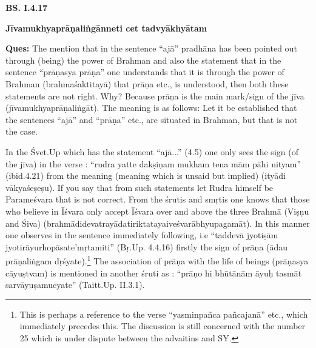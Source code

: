 
\textbf{BS. I.4.17}

\textbf{Jīvamukhyaprāṇaliṅgānneti cet tadvyākhyātam}

\textbf{Ques:} The mention that in the sentence “ajā” pradhāna has been pointed out through (being) the power of Brahman and also the statement that in the sentence “prāṇasya prāṇa” one understands that it is through the power of Brahman (brahmaśaktitayā) that prāṇa etc., is understood, then both these statements are not right. Why?  Because prāṇa is the main mark/sign of the jīva (jīvamukhyaprāṇaliṅgāt). The meaning is as follows: Let it be established that the sentences “ajā” and “prāṇa” etc., are situated in Brahman, but that is not the case. 

In the Śvet.Up which has the statement “ajā...” (4.5) one only sees the sign (of the jīva) in the verse : “rudra yatte dakṣiṇam mukham tena mām pāhi nityam” (ibid.4.21) from the meaning (meaning which is unsaid but implied) (ityādi vākyaśeṣeṣu). If you say that from such statements let Rudra himself be Parameśvara that is not correct. From the śrutis and smṛtis one knows that those who believe in Īśvara only accept Īśvara over and above the three Brahmā (Viṣṇu and Śiva) (brahmādidevatrayādatiriktatayaiveśvarābhyupagamāt). In this manner one observes in the sentence immediately following, i.e “taddevā jyotiṣām jyotirāyurhopāsate’mṛtamiti” (Bṛ.Up. 4.4.16) firstly the sign of prāṇa (ādau prāṇaliṅgam dṛśyate).\footnote{This is perhaps a reference to the verse “yasminpañca pañcajanā” etc., which immediately precedes this. The discussion is still concerned with the number 25 which is under dispute between the  advaitins and SY.} The association of prāṇa with the life of beings (prāṇasya cāyuṣtvam) is mentioned in another śruti as : “prāṇo hi bhūtānām āyuḥ tasmāt sarvāyuṣamucyate” (Taitt.Up. II.3.1).
 
